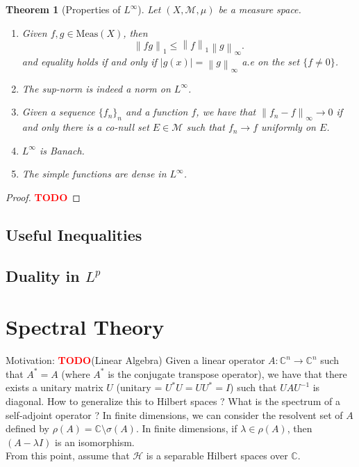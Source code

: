 \documentclass{article}
\newtheorem*{theorem}{Theorem}
\newcommand{\C}{\mathbb{C}}
\newcommand{\M}{\mathcal{M}}
\renewcommand{\H}{\mathcal{H}}
\newcommand{\lnorm}[2]{\left\lVert#2 \right\rVert_{#1}}
\newcommand{\td}{\textcolor{red}{\textbf{TODO}}}
\begin{document}
\begin{theorem}[Properties of $L^{\infty}$]
    Let $(X, \M, \mu)$ be a measure space.
    \begin{enumerate}
        \item Given $f,g \in \text{Meas}(X)$, then 
        $$\lnorm{1}{fg} \leq \lnorm{1}{f} \lnorm{\infty}{g}.$$
        and equality holds if and only if $|g(x)| = \lnorm{\infty}{g}$ a.e on the set $\{f \neq 0\}$.
        \item The sup-norm is indeed a norm on $L^{\infty}$.
        \item Given a sequence $\{f_n\}_n$ and a function $f$, we have that $\lnorm{\infty}{f_n - f} \rightarrow 0$ if and only there is a co-null set $E \in \M$ such that $f_n \rightarrow f$ uniformly on $E$.
        \item $L^{\infty}$ is Banach.
        \item The simple functions are dense in $L^{\infty}$.
    \end{enumerate}
\end{theorem}

\begin{proof}
    \td 
\end{proof}

\subsection{Useful Inequalities}

\subsection{Duality in $L^p$}

\section{Spectral Theory}

Motivation: \td (Linear Algebra) Given a linear operator $A : \C^n \to \C^n$ such that $A^* = A$ (where $A^*$ is the conjugate transpose operator), we have that there exists a unitary matrix $U$ (unitary = $U^* U = U U^* = I$) such that $UAU^{-1}$ is diagonal. How to generalize this to Hilbert spaces ? What is the spectrum of a self-adjoint operator ? In finite dimensions, we can consider the resolvent set of $A$ defined by $\rho(A) = \C \setminus \sigma(A)$. In finite dimensions, if $\lambda \in \rho(A)$, then $(A - \lambda I)$ is an isomorphism. \\
From this point, assume that $\H$ is a separable Hilbert spaces over $\C$.
\end{document}
